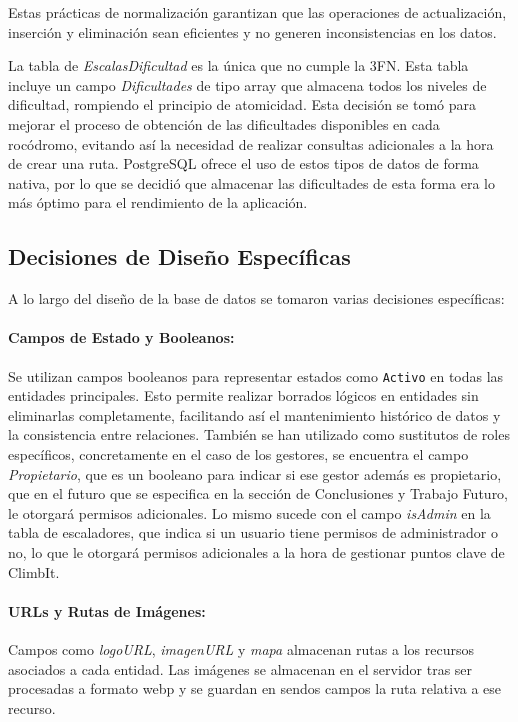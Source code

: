 Estas prácticas de normalización garantizan que las operaciones de actualización, inserción y eliminación sean eficientes 
y no generen inconsistencias en los datos.

La tabla de \textit{EscalasDificultad} es la única que no cumple la 3FN. Esta tabla incluye un campo \textit{Dificultades} de tipo array que almacena todos los niveles
de dificultad, rompiendo el principio de atomicidad. Esta decisión se tomó para mejorar el proceso de obtención de las dificultades disponibles en cada rocódromo, 
evitando así la necesidad de realizar consultas adicionales a la hora de crear una ruta. PostgreSQL ofrece el uso de estos tipos de datos de forma nativa, 
por lo que se decidió que almacenar las dificultades de esta forma era lo más óptimo para el rendimiento de la aplicación.

\subsection{Decisiones de Diseño Específicas}

A lo largo del diseño de la base de datos se tomaron varias decisiones específicas:

\paragraph{Campos de Estado y Booleanos:} Se utilizan campos booleanos para representar estados como \texttt{Activo} en todas las entidades principales. Esto permite
realizar borrados lógicos en entidades sin eliminarlas completamente, facilitando así el mantenimiento histórico de datos y la consistencia entre relaciones. También
se han utilizado como sustitutos de roles específicos, concretamente en el caso de los gestores, se encuentra el campo \textit{Propietario}, que es un booleano para indicar 
si ese gestor además es propietario, que en el futuro que se especifica en la sección de Conclusiones y Trabajo Futuro, le otorgará permisos adicionales. Lo mismo 
sucede con el campo \textit{isAdmin} en la tabla de escaladores, que indica si un usuario tiene permisos de administrador o no, lo que le otorgará permisos adicionales
a la hora de gestionar puntos clave de ClimbIt.

\paragraph{URLs y Rutas de Imágenes:} Campos como \textit{logoURL}, \textit{imagenURL} y \textit{mapa} almacenan 
rutas a los recursos asociados a cada entidad. Las imágenes se almacenan en el servidor tras ser procesadas 
a formato webp y se guardan en sendos campos la ruta relativa a ese recurso.

